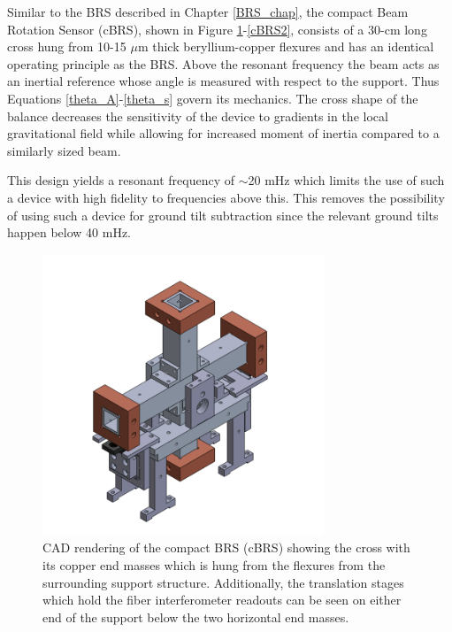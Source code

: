 \documentclass [12pt, proquest]{uwthesis}[2019]
\begin{document}
Similar to the BRS described in Chapter \ref{BRS_chap}, the compact Beam Rotation Sensor (cBRS), shown in Figure \ref{cBRS1}-\ref{cBRS2}, consists of a 30-cm long cross hung from 10-15 $\mu$m thick beryllium-copper flexures and has an identical operating principle as the BRS. Above the resonant frequency the beam acts as an inertial reference whose angle is measured with respect to the support. Thus Equations \ref{theta_A}-\ref{theta_s} govern its mechanics. The cross shape of the balance decreases the sensitivity of the device to gradients in the local gravitational field while allowing for increased moment of inertia compared to a similarly sized beam. 

This design yields a resonant frequency of $\sim$20 mHz which limits the use of such a device with high fidelity to frequencies above this. This removes the possibility of using such a device for ground tilt subtraction since the relevant ground tilts happen below 40 mHz. 

\begin{figure}[!h]
\begin{center}
\includegraphics[width=0.75\textwidth]{cBRSIso.png}
\end{center}
\caption[CAD rendering of the cBRS]{CAD rendering of the compact BRS (cBRS) showing the cross with its copper end masses which is hung from the flexures from the surrounding support structure. Additionally, the translation stages which hold the fiber interferometer readouts can be seen on either end of the support below the two horizontal end masses.}
\label{cBRS1}
\end{figure}
\end{document}
